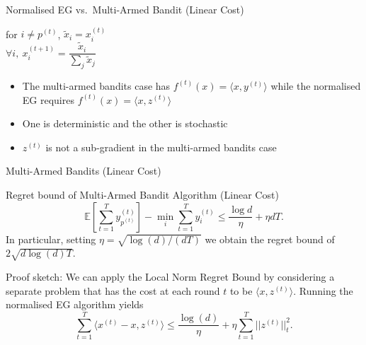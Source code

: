 \begin{frame}{Normalised EG vs.\ Multi-Armed Bandit (Linear Cost)}
{{\begin{minipage}[t][4.9cm][t]{0.46\paperwidth}
      \qquad for $i \neq p^{(t)}$, $\tilde{x}_i = x^{(t)}_i$ \\
      \qquad $\forall i,\ x^{(t+1)}_i = \dfrac{\tilde{x}_i}{\sum_j \tilde{x}_j}$
    \end{minipage}}%
  }\pause
  \begin{itemize}
      \item The multi-armed bandits case has $f^{(t)}(x) = \langle x, y^{(t)} \rangle$ while the normalised EG requires $f^{(t)}(x) = \langle x, z^{(t)} \rangle$\pause
      \item One is deterministic and the other is stochastic \pause
      \item $z^{(t)}$ is not a sub-gradient in the multi-armed bandits case
  \end{itemize}
\end{frame}


\begin{frame}{Multi-Armed Bandits (Linear Cost)}
    \small
    \begin{block}{Regret bound of Multi-Armed Bandit Algorithm (Linear Cost)}
        $$
        \mathbb{E}\left[\sum_{t=1}^{T} y^{(t)}_{p^{(t)}}\right] - \min_i \sum_{t=1}^{T} y^{(t)}_i
        \leq \frac{\log d}{\eta} + \eta d T.
        $$
        In particular, setting $\eta = \sqrt{\log(d)/(dT)}$ we obtain the regret bound of
        $2\sqrt{d \log(d) T}$.
    \end{block}
    Proof sketch: We can apply the Local Norm Regret Bound by considering a separate problem that has the cost at each round $t$ to be $\langle x, z^{(t)} \rangle$. Running the normalised EG algorithm yields
    $$
    \sum_{t=1}^T \langle x^{(t)} - x, z^{(t)} \rangle
    \leq \frac{\log(d)}{\eta} + \eta \sum_{t=1}^T ||z^{(t)}||^2_t.
    $$
\end{frame}

